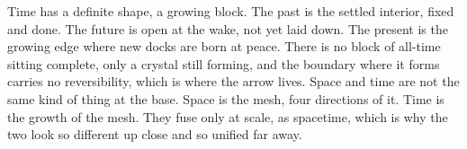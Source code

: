 Time has a definite shape, a growing block. The past is the settled interior, fixed and done. The future is open at the wake, not yet laid down. The present is the growing edge where new docks are born at peace. There is no block of all-time sitting complete, only a crystal still forming, and the boundary where it forms carries no reversibility, which is where the arrow lives. Space and time are not the same kind of thing at the base. Space is the mesh, four directions of it. Time is the growth of the mesh. They fuse only at scale, as spacetime, which is why the two look so different up close and so unified far away.
